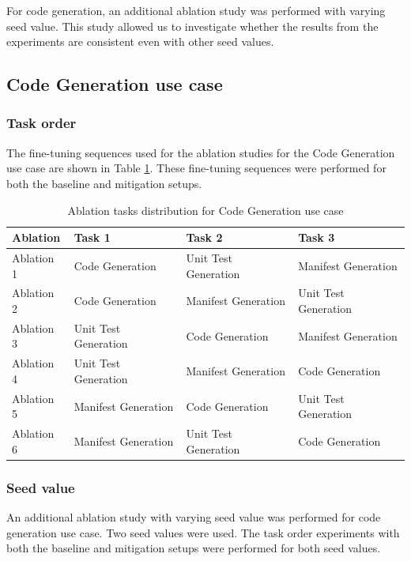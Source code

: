 For code generation, an additional ablation study was performed with varying seed value. This study allowed us to investigate whether the results from the experiments are consistent even with other seed values. 

\subsection{Code Generation use case}
\subsubsection{Task order}
The fine-tuning sequences used for the ablation studies for the Code Generation use case are shown in Table \ref{tab:CodeTaskOrder}. These fine-tuning sequences were performed for both the baseline and mitigation setups.

\begin{table}[h!]
\centering
\caption{Ablation tasks distribution for Code Generation use case}
\label{tab:CodeTaskOrder}
\begin{tabular}{| m{2cm} | m{3.4cm} | m{3.4cm} | m{3.4cm} |}
\hline
\textbf{Ablation} & \textbf{Task 1} & \textbf{Task 2} & \textbf{Task 3} \\
\hline
Ablation 1 & Code Generation & Unit Test Generation & Manifest Generation \\
\hline
Ablation 2 & Code Generation & Manifest Generation & Unit Test Generation \\
\hline
Ablation 3 & Unit Test Generation & Code Generation & Manifest Generation \\
\hline
Ablation 4 & Unit Test Generation & Manifest Generation & Code Generation \\
\hline
Ablation 5 & Manifest Generation & Code Generation & Unit Test Generation \\
\hline
Ablation 6 & Manifest Generation & Unit Test Generation & Code Generation \\
\hline
\end{tabular}
\end{table}

\subsubsection{Seed value}
An additional ablation study with varying seed value was performed for code generation use case. Two seed values were used. The task order experiments with both the baseline and mitigation setups were performed for both seed values.

